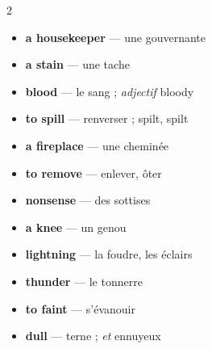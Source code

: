 \documentclass[troisieme]{fiche}
\begin{document}
\begin{multicols}{2}\small
\begin{itemize}[label=--,itemsep=0.8mm,leftmargin=*]
  \item \textbf{a housekeeper} — une gouvernante
  \item \textbf{a stain} — une tache
  \item \textbf{blood} — le sang ; \textit{adjectif} bloody
  \item \textbf{to spill} — renverser ; spilt, spilt
  \item \textbf{a fireplace} — une cheminée
  \item \textbf{to remove} — enlever, ôter
  \item \textbf{nonsense} — des sottises
  \item \textbf{a knee} — un genou
  \item \textbf{lightning} — la foudre, les éclairs
  \item \textbf{thunder} — le tonnerre
  \item \textbf{to faint} — s'évanouir
  \item \textbf{dull} — terne ; \textit{et} ennuyeux
\end{itemize}
\end{multicols}
\end{document}
